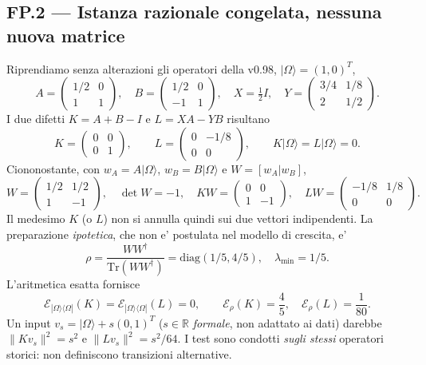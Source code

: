\documentclass[11pt,a4paper]{article}
\begin{document}
\subsection*{FP.2 --- Istanza razionale congelata, nessuna nuova matrice}
Riprendiamo senza alterazioni gli operatori della v0.98, $|\Omega\rangle=(1,0)^T$,
\begin{equation}
A=\begin{pmatrix}1/2&0\\1&1\end{pmatrix},\quad
B=\begin{pmatrix}1/2&0\\-1&1\end{pmatrix},\quad
X=\tfrac12I,\quad
Y=\begin{pmatrix}3/4&1/8\\2&1/2\end{pmatrix}.\tag{FP.3}
\end{equation}
I due difetti $K=A+B-I$ e $L=XA-YB$ risultano
\begin{equation}
K=\begin{pmatrix}0&0\\0&1\end{pmatrix},\qquad
L=\begin{pmatrix}0&-1/8\\0&0\end{pmatrix},\qquad
K|\Omega\rangle=L|\Omega\rangle=0.\tag{FP.4}
\end{equation}
Ciononostante, con $w_A=A|\Omega\rangle$, $w_B=B|\Omega\rangle$ e $W=[w_A|w_B]$,
\begin{equation}
W=\begin{pmatrix}1/2&1/2\\1&-1\end{pmatrix},\quad
\det W=-1,\quad
KW=\begin{pmatrix}0&0\\1&-1\end{pmatrix},\quad
LW=\begin{pmatrix}-1/8&1/8\\0&0\end{pmatrix}.\tag{FP.5}
\end{equation}
Il medesimo $K$ (o $L$) non si annulla quindi sui due vettori indipendenti. La preparazione \emph{ipotetica}, che non e' postulata nel modello di crescita, e'
\begin{equation}
\rho=\frac{WW^\dagger}{\mathrm{Tr}(WW^\dagger)}
=\mathrm{diag}(1/5,4/5),\quad
\lambda_{\min}=1/5.\tag{FP.6}
\end{equation}
L'aritmetica esatta fornisce
\begin{equation}
\mathcal E_{|\Omega\rangle\langle\Omega|}(K)
=\mathcal E_{|\Omega\rangle\langle\Omega|}(L)=0,
\qquad \mathcal E_\rho(K)=\frac45,\quad
\mathcal E_\rho(L)=\frac1{80}.\tag{FP.7}
\end{equation}
Un input $v_s=|\Omega\rangle+s(0,1)^T$ ($s\in\mathbb R$ \emph{formale}, non adattato ai dati) darebbe $\|Kv_s\|^2=s^2$ e $\|Lv_s\|^2=s^2/64$. I test sono condotti \emph{sugli stessi} operatori storici: non definiscono transizioni alternative.
\end{document}
